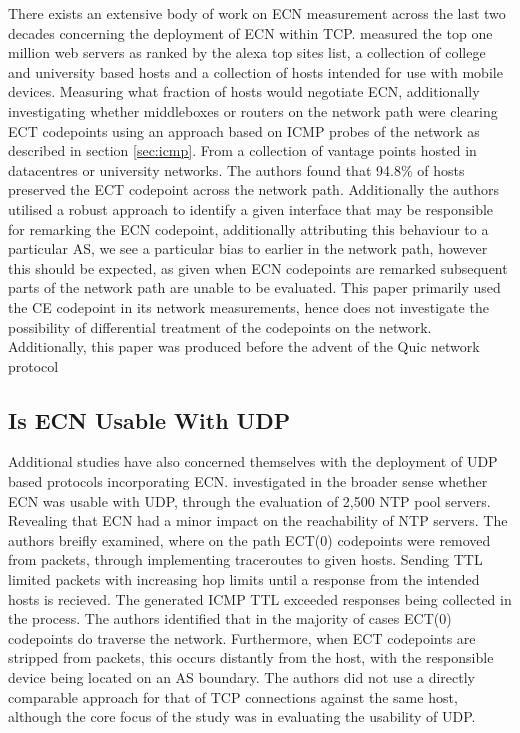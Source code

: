 \documentclass{l4proj}
\begin{document}
There exists an extensive body of work on ECN measurement across the last two decades concerning the deployment of ECN within TCP. \cite{bauer_measuring_2011} measured the top one million web servers as ranked by the alexa top sites list, a collection of college and university based hosts and a collection of hosts intended for use with mobile devices. Measuring what fraction of hosts would negotiate ECN, additionally investigating whether middleboxes or routers on the network path were clearing ECT codepoints using an approach based on ICMP probes of the network as described in section \ref{sec:icmp}. From a collection of vantage points hosted in datacentres or university networks. The authors found that 94.8\% of hosts preserved the ECT codepoint across the network path. Additionally the authors utilised a robust approach to identify a given interface that may be responsible for remarking the ECN codepoint, additionally attributing this behaviour to a particular AS, we see a particular bias to earlier in the network path, however this should be expected, as given when ECN codepoints are remarked subsequent parts of the network path are unable to be evaluated. This paper primarily used the CE codepoint in its network measurements, hence does not investigate the possibility of differential treatment of the codepoints on the network. Additionally, this paper was produced before the advent of the Quic network protocol


\subsection{Is ECN Usable With UDP}

Additional studies have also concerned themselves with the deployment of UDP based protocols incorporating ECN. \cite{mcquistin_is_2015} investigated in the broader sense whether ECN was usable with UDP, through the evaluation of 2,500 NTP pool servers. Revealing that ECN had a minor impact on the reachability of NTP servers. The authors breifly examined, where on the path ECT(0) codepoints were removed from packets, through implementing traceroutes to given hosts. Sending TTL limited packets with increasing hop limits until a response from the intended hosts is recieved. The generated ICMP TTL exceeded responses being collected in the process. The authors identified that in the majority of cases ECT(0) codepoints do traverse the network. Furthermore, when ECT codepoints are stripped from packets, this occurs distantly from the host, with the responsible device being located on an AS boundary. The authors did not use a directly comparable approach for that of TCP connections against the same host, although the core focus of the study was in evaluating the usability of UDP.
\end{document}
